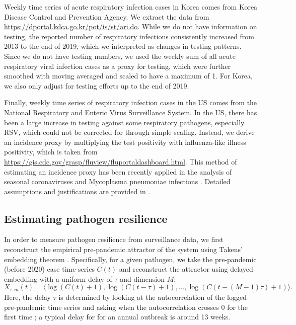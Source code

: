 \documentclass[12pt]{article}
\begin{document}
Weekly time series of acute respiratory infection cases in Korea comes from Korea Disease Control and Prevention Agency.
We extract the data from \url{https://dportal.kdca.go.kr/pot/is/st/ari.do}.
While we do not have information on testing, the reported number of respiratory infections consistently increased from 2013 to the end of 2019, which we interpreted as changes in testing patterns.
Since we do not have testing numbers, we used the weekly sum of all acute respiratory viral infection cases as a proxy for testing, which were further smoothed with moving averaged and scaled to have a maximum of 1.
For Korea, we also only adjust for testing efforts up to the end of 2019.

Finally, weekly time series of respiratory infection cases in the US comes from the National Respiratory and Enteric Virus Surveillance System.
In the US, there has been a large increase in testing against some respiratory pathogens, especially RSV, which could not be corrected for through simple scaling.
Instead, we derive an incidence proxy by multiplying the test positivity with influenza-like illness positivity, which is taken from \url{https://gis.cdc.gov/grasp/fluview/fluportaldashboard.html}.
This method of estimating an incidence proxy has been recently applied in the analysis of seasonal coronaviruses \citep{kissler2020projecting} and Mycoplasma pneumoniae infections \citep{park2024predicting}.
Detailed assumptions and justifications are provided in \citep{goldstein2011predicting}.

\subsection*{Estimating pathogen resilience}

In order to measure pathogen resilience from surveillance data, we first reconstruct the empirical pre-pandemic attractor of the system using Takens' embedding theorem \citep{takens2006detecting}.
Specifically, for a given pathogen, we take the pre-pandemic (before 2020) case time series $C(t)$ and reconstruct the attractor using delayed embedding with a uniform delay of $\tau$ and dimension $M$:
\begin{equation}
X_{\tau,m}(t) = \langle\log(C(t)+1), \log(C(t-\tau)+1), \dots, \log(C(t-(M-1)\tau)+1)\rangle.
\end{equation}
Here, the delay $\tau$ is determined by looking at the autocorrelation of the logged pre-pandemic time series and asking when the autocorrelation crosses 0 for the first time \citep{tan2023selecting};
a typical delay for for an annual outbreak is around 13 weeks.
\end{document}
